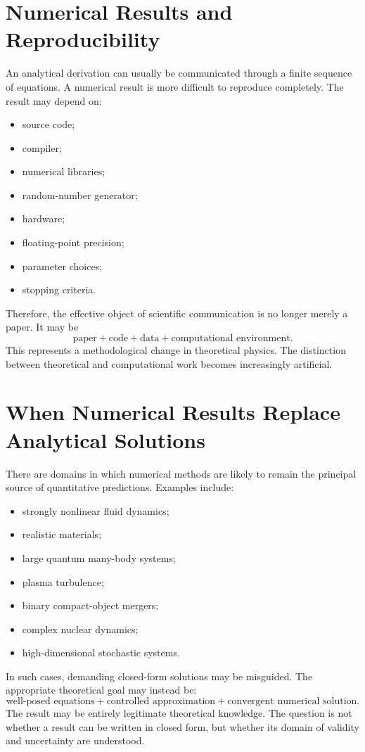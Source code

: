 \section{ Numerical Results and Reproducibility}
\label{nm:res}

An analytical derivation can usually be communicated through a finite sequence
of equations.
A numerical result is more difficult to reproduce completely.
The result may depend on:
\begin{itemize}
\item source code;
\item compiler;
\item numerical libraries;
\item random-number generator;
\item hardware;
\item floating-point precision;
\item parameter choices;
\item stopping criteria.
\end{itemize}
Therefore, the effective object of scientific communication is no longer merely
a paper. It may be
\[\boxed{\text{paper}+\text{code}+\text{data}+\text{computational environment}.}\]
This represents a methodological change in theoretical physics.
The distinction between theoretical and computational work becomes increasingly artificial.

\section{ When Numerical Results Replace Analytical Solutions}
\label{nm:wnr}

There are domains in which numerical methods are likely to remain the principal
source of quantitative predictions.
Examples include:
\begin{itemize}
\item strongly nonlinear fluid dynamics;
\item realistic materials;
\item large quantum many-body systems;
\item plasma turbulence;
\item binary compact-object mergers;
\item complex nuclear dynamics;
\item high-dimensional stochastic systems.
\end{itemize}
In such cases, demanding closed-form solutions may be misguided.
The appropriate theoretical goal may instead be:
\[\text{well-posed equations}+\text{controlled approximation}+
\text{convergent numerical solution}.\]
The result may be entirely legitimate theoretical knowledge.
The question is not whether a result can be written in closed form, but whether
its domain of validity and uncertainty are understood.

